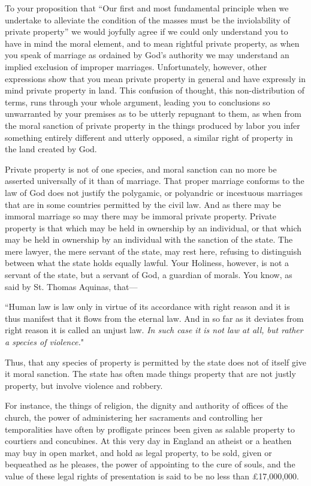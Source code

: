 \documentclass{book}
\begin{document}
To your proposition that “Our first and most fundamental principle when we undertake to alleviate the condition of the masses must be the inviolability of private property” we would joyfully agree if we could only understand you to have in mind the moral element, and to mean rightful private property, as when you speak of marriage as ordained by God’s authority we may understand an implied exclusion of improper marriages. Unfortunately, however, other expressions show that you mean private property in general and have expressly in mind private property in land. This confusion of thought, this non-distribution of terms, runs through your whole argument, leading you to conclusions so unwarranted by your premises as to be utterly repugnant to them, as when from the moral sanction of private property in the things produced by labor you infer something entirely different and utterly opposed, a similar right of property in the land created by God.

Private property is not of one species, and moral sanction can no more be asserted universally of it than of marriage. That proper marriage conforms to the law of God does not justify the polygamic, or polyandric or incestuous marriages that are in some countries permitted by the civil law. And as there may be immoral marriage so may there may be immoral private property. Private property is that which may be held in ownership by an individual, or that which may be held in ownership by an individual with the sanction of the state. The mere lawyer, the mere servant of the state, may rest here, refusing to distinguish between what the state holds equally lawful. Your Holiness, however, is not a servant of the state, but a servant of God, a guardian of morals. You know, as said by St. Thomas Aquinas, that—

“Human law is law only in virtue of its accordance with right reason and it is thus manifest that it flows from the eternal law. And in so far as it deviates from right reason it is called an unjust law. \emph{In such case it is not law at all, but rather a species of violence.}"

Thus, that any species of property is permitted by the state does not of itself give it moral sanction. The state has often made things property that are not justly property, but involve violence and robbery.

For instance, the things of religion, the dignity and authority of offices of the church, the power of administering her sacraments and controlling her temporalities have often by profligate princes been given as salable property to courtiers and concubines. At this very day in England an atheist or a heathen may buy in open market, and hold as legal property, to be sold, given or bequeathed as he pleases, the power of appointing to the cure of souls, and the value of these legal rights of presentation is said to be no less than £17,000,000.
\end{document}
